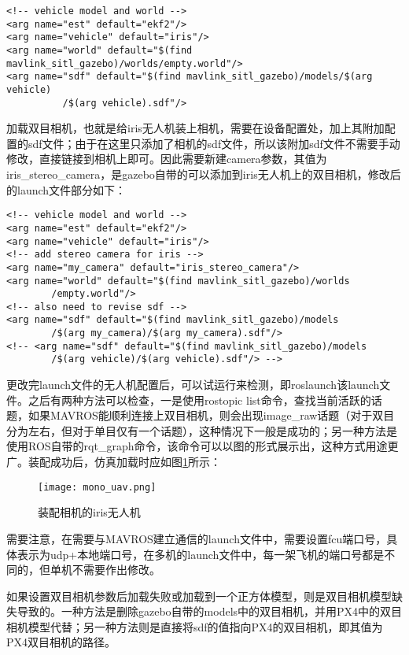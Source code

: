 \begin{verbatim}
<!-- vehicle model and world -->
<arg name="est" default="ekf2"/>
<arg name="vehicle" default="iris"/>
<arg name="world" default="$(find mavlink_sitl_gazebo)/worlds/empty.world"/>
<arg name="sdf" default="$(find mavlink_sitl_gazebo)/models/$(arg vehicle)
          /$(arg vehicle).sdf"/>
\end{verbatim}

加载双目相机，也就是给iris无人机装上相机，需要在设备配置处，加上其附加配置的sdf文件；由于在这里只添加了相机的sdf文件，所以该附加sdf文件不需要手动修改，直接链接到相机上即可。因此需要新建camera参数，其值为iris\_stereo\_camera，是gazebo自带的可以添加到iris无人机上的双目相机，修改后的launch文件部分如下：

\begin{verbatim}
<!-- vehicle model and world -->
<arg name="est" default="ekf2"/>
<arg name="vehicle" default="iris"/>
<!-- add stereo camera for iris -->
<arg name="my_camera" default="iris_stereo_camera"/>
<arg name="world" default="$(find mavlink_sitl_gazebo)/worlds
        /empty.world"/>
<!-- also need to revise sdf -->
<arg name="sdf" default="$(find mavlink_sitl_gazebo)/models
        /$(arg my_camera)/$(arg my_camera).sdf"/>
<!-- <arg name="sdf" default="$(find mavlink_sitl_gazebo)/models
        /$(arg vehicle)/$(arg vehicle).sdf"/> -->
\end{verbatim}

更改完launch文件的无人机配置后，可以试运行来检测，即roslaunch该launch文件。之后有两种方法可以检查，一是使用rostopic list命令，查找当前活跃的话题，如果MAVROS能顺利连接上双目相机，则会出现image\_raw话题（对于双目分为左右，但对于单目仅有一个话题），这种情况下一般是成功的；另一种方法是使用ROS自带的rqt\_graph命令，该命令可以以图的形式展示出，这种方式用途更广。装配成功后，仿真加载时应如图\ref{fig4-2}所示：


\begin{figure}[!ht]
	\centering
	\texttt{[image: mono\_uav.png]}
	\caption{装配相机的iris无人机}
	\label{fig4-2}
\end{figure}

需要注意，在需要与MAVROS建立通信的launch文件中，需要设置fcu端口号，具体表示为udp+本地端口号，在多机的launch文件中，每一架飞机的端口号都是不同的，但单机不需要作出修改。

如果设置双目相机参数后加载失败或加载到一个正方体模型，则是双目相机模型缺失导致的。一种方法是删除gazebo自带的models中的双目相机，并用PX4中的双目相机模型代替；另一种方法则是直接将sdf的值指向PX4的双目相机，即其值为PX4双目相机的路径。


